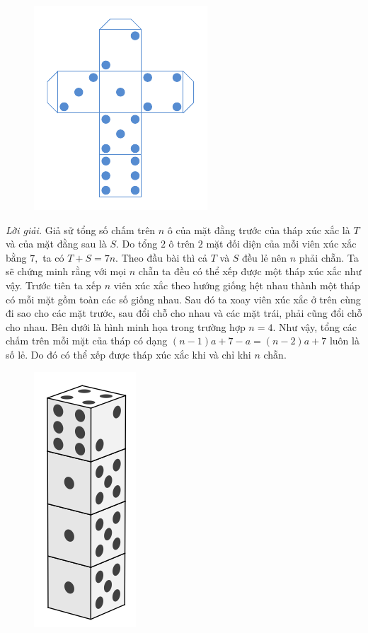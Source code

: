 \begin{multicols}{2}
\begin{figure}[H]
		\includegraphics[height= 0.8\linewidth]{OC}
		\vspace*{-10pt}
	\end{figure}
	\textit{Lời giải.} Giả sử tổng số chấm trên $n$ ô của mặt đằng trước của tháp xúc xắc là $T$ và của mặt đằng sau là $S.$ Do tổng $2$ ô trên $2$ mặt đối diện của mỗi viên xúc xắc bằng $7,$ ta có $T+S=7n.$ Theo đầu bài thì cả $T$ và $S$ đều lẻ nên $n$ phải chẵn.
	\vskip 0.1cm
	Ta sẽ chứng minh rằng với mọi $n$ chẵn ta đều có thể xếp được một tháp xúc xắc như vậy. Trước tiên ta xếp $n$ viên xúc xắc theo hướng giống hệt nhau thành một tháp có mỗi mặt gồm toàn các số giống nhau. Sau đó ta xoay viên xúc xắc ở trên cùng đi sao cho các mặt trước, sau đổi chỗ cho nhau và các  mặt trái, phải cũng đổi chỗ cho nhau. 
	\vskip 0.1cm
	Bên dưới là hình minh họa trong trường hợp $n=4.$   Như vậy, tổng các chấm trên mỗi mặt của tháp có dạng $(n-1)a + 7-a=(n-2)a+7$ luôn là số lẻ. Do đó có thể xếp được tháp xúc xắc khi và chỉ khi $n$ chẵn.  
	\begin{figure}[H]
		\vspace*{-5pt}
		\centering
		\captionsetup{labelformat= empty, justification=centering}
		\includegraphics[width= 0.3\linewidth]{OC33b}

\end{figure}
\end{multicols}
